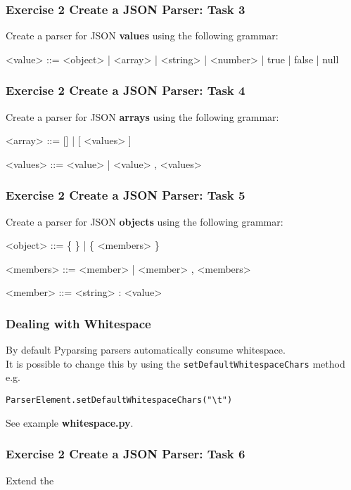 \documentclass{beamer}
\begin{document}
\begin{frame}[fragile]
\frametitle{Exercise 2 Create a JSON Parser: Task 3}
Create a parser for JSON \textbf{values} using the following grammar:
\medskip
\begin{grammar}
<value> ::= <object> | <array> | <string> | <number> | true | false | null
\end{grammar}
\end{frame}

\begin{frame}[fragile]
\frametitle{Exercise 2 Create a JSON Parser: Task 4}
Create a parser for JSON \textbf{arrays} using the following grammar:
\medskip
\begin{grammar}
<array> ::= [] | [ <values> ]

<values> ::= <value> | <value> , <values>
\end{grammar}
\end{frame}

\begin{frame}[fragile]
\frametitle{Exercise 2 Create a JSON Parser: Task 5}
Create a parser for JSON \textbf{objects} using the following grammar:
\medskip
\begin{grammar}
<object> ::= \{ \} | \{ <members> \}

<members> ::= <member> | <member> , <members>

<member> ::= <string> : <value>
\end{grammar}
\end{frame}


\begin{frame}[fragile]
\frametitle{Dealing with Whitespace}
By default Pyparsing parsers automatically consume whitespace. \\
\medskip
It is possible to change this by using the \texttt{setDefaultWhitespaceChars} method e.g. \\
\medskip
\begin{verbatim}
ParserElement.setDefaultWhitespaceChars("\t")
\end{verbatim}
\bigskip
See example \textbf{whitespace.py}.

\end{frame}


\begin{frame}[fragile]
\frametitle{Exercise 2 Create a JSON Parser: Task 6}
Extend the
\end{frame}
\end{document}
